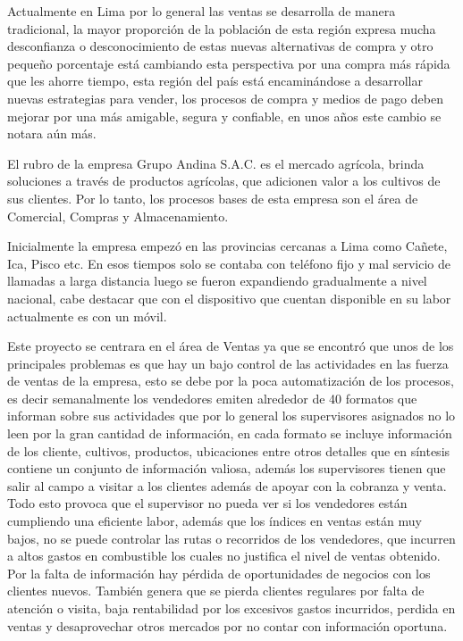 Actualmente en Lima por lo general las ventas se desarrolla de manera tradicional, la mayor proporción de la población de esta región expresa mucha desconfianza o desconocimiento de estas nuevas alternativas de compra y otro pequeño porcentaje está cambiando esta perspectiva  por una compra más rápida que les ahorre tiempo, esta región del país está encaminándose a desarrollar nuevas estrategias para vender, los procesos de compra y medios de pago deben mejorar por una más amigable, segura y confiable, en unos años este cambio se notara aún más.

El rubro de la empresa Grupo Andina S.A.C. es el mercado agrícola, brinda soluciones a través de productos agrícolas, que adicionen valor a los cultivos de sus clientes. Por lo tanto, los procesos bases de esta empresa son el área de Comercial, Compras y Almacenamiento.

Inicialmente la empresa empezó en las provincias cercanas a Lima como Cañete, Ica, Pisco etc. En esos tiempos solo se contaba con teléfono fijo y mal servicio de llamadas a larga distancia luego se fueron expandiendo gradualmente a nivel nacional, cabe destacar que con el dispositivo que cuentan disponible en su labor actualmente es con un móvil.

Este proyecto se centrara en el área de Ventas ya que se encontró que unos de los principales problemas es que hay un bajo control de las actividades en las fuerza de ventas de la empresa, esto se debe por la poca automatización de los procesos, es decir semanalmente los vendedores emiten alrededor de 40 formatos que informan sobre sus actividades que por lo general los supervisores asignados no lo leen por la gran cantidad de información, en cada formato se incluye información de los cliente, cultivos, productos, ubicaciones entre otros detalles que en síntesis contiene un conjunto de información valiosa, además los supervisores tienen que salir al campo a visitar a los clientes además de apoyar con la cobranza y venta. Todo esto provoca que el supervisor no pueda ver si los vendedores están cumpliendo una eficiente labor, además que los índices en ventas están muy bajos, no se puede controlar las rutas o recorridos de los vendedores, que incurren a altos gastos en combustible los cuales no justifica el nivel de ventas obtenido. Por la falta de información hay pérdida de oportunidades de negocios con los clientes nuevos. También genera que se pierda clientes regulares por falta de atención o visita, baja rentabilidad por los excesivos gastos incurridos, perdida en ventas y desaprovechar otros mercados por no contar con información oportuna.

